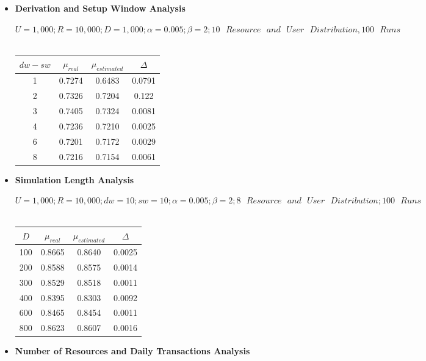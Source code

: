 \documentclass[12pt,a4paper]{report}
\begin{document}
\begin{itemize}
	\item \textbf{Derivation and Setup Window Analysis}

\begin{center}
\textup{\textbf{$U=1,000; R=10,000; D=1,000; \alpha=0.005; \beta=2; 10\text{ }Resource\text{ }and\text{ }User\text{ }Distribution, 100\text{ }Runs$\\}}
\textup{\\}
\begin{tabular}{|c|c|c|c|}
\hline
\textbf{$dw-sw$} & \textbf{$\mu_{real}$} & \textbf{$\mu_{estimated}$} & \textbf{$\Delta$}\\
\hline
1 & 0.7274 & 0.6483 & 0.0791 \\
\hline
2 & 0.7326 & 0.7204 & 0.122 \\
\hline
3 & 0.7405 & 0.7324 & 0.0081 \\
\hline
4 & 0.7236 & 0.7210 & 0.0025 \\
\hline
6 & 0.7201 & 0.7172 & 0.0029 \\
\hline
8 & 0.7216 & 0.7154 & 0.0061 \\
\hline
\end{tabular}
\end{center}

	\item \textbf{Simulation Length Analysis}

\begin{center}
\textup{\textbf{$U=1,000; R=10,000; dw=10; sw=10; \alpha=0.005; \beta=2; 8\text{ }Resource\text{ }and\text{ }User\text{ }Distribution; 100\text{ }Runs$\\}}
\textup{\\}
\begin{tabular}{|c|c|c|c|}
\hline
\textbf{$D$} & \textbf{$\mu_{real}$} & \textbf{$\mu_{estimated}$} & \textbf{$\Delta$}\\
\hline
100 & 0.8665 & 0.8640 & 0.0025 \\
\hline
200 & 0.8588 & 0.8575  & 0.0014 \\
\hline
300 & 0.8529 & 0.8518  & 0.0011 \\
\hline
400 & 0.8395 & 0.8303 & 0.0092 \\
\hline
600 & 0.8465 & 0.8454 & 0.0011 \\
\hline
800 & 0.8623 & 0.8607 & 0.0016 \\
\hline
\end{tabular}
\end{center}


	\item \textbf{Number of Resources and Daily Transactions Analysis}


\end{itemize}
\end{document}
